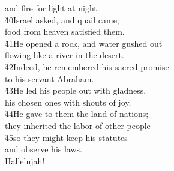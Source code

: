 \begin{poetry}
\poemll    and fire for light at night. \\
\poeml \v{40}Israel asked, and quail came; \\
\poemll    food from heaven satisfied them. \\
\poeml \v{41}He opened a rock, and water gushed out \\
\poemll    flowing like a river in the desert. \\
\poeml \v{42}Indeed, he remembered his sacred promise \\
\poemll    to his servant Abraham. \\
\poeml \v{43}He led his people out with gladness, \\
\poemll    his chosen ones with shouts of joy. \\
\poeml \v{44}He gave to them the land of nations; \\
\poemll    they inherited the labor of other people \\
\poeml \v{45}so they might keep his statutes \\
\poemll    and observe his laws. \\
\poemlll       Hallelujah!
\end{poetry}

